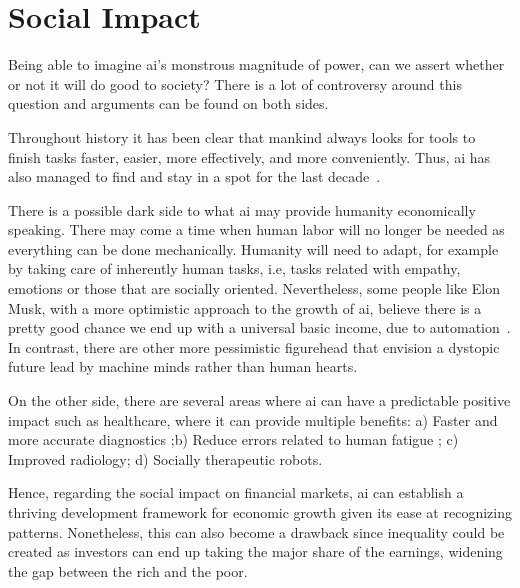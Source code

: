 \chapter{Social Impact}
\label{imp:impacto}

Being able to imagine \gls{ai}'s monstrous magnitude of power, can we assert whether or not it will do good to society? There is a lot of controversy around this question and arguments can be found on both sides.

Throughout history it has been clear that mankind always looks for tools to finish tasks faster, easier, more effectively, and more conveniently. Thus, \gls{ai} has also managed to find and stay in a spot for the last decade~\cite{tai2020impact}.

There is a possible dark side to what \gls{ai} may provide humanity economically speaking. There may come a time when human labor will no longer be needed as everything can be done mechanically. Humanity will need to adapt, for example by taking care of inherently human tasks, i.e, tasks related with empathy, emotions or those that are socially oriented. Nevertheless, some people like Elon Musk, with a more optimistic approach to the growth of \gls{ai}, believe there is a pretty good chance we end up with a universal basic income, due to automation~\cite{elonBasicIncome}. In contrast, there are other more pessimistic figurehead that envision a dystopic future lead by machine minds rather than human hearts.

On the other side, there are several areas where \gls{ai} can have a predictable positive impact such as healthcare, where it can provide multiple benefits: a) Faster and more accurate diagnostics ;b) Reduce errors related to human fatigue ; c) Improved radiology; d) Socially therapeutic robots.

Hence, regarding the social impact on financial markets, \gls{ai} can establish a thriving development framework for economic growth given its ease at recognizing patterns. Nonetheless, this can also become a drawback since inequality could be created as investors can end up taking the major share of the earnings, widening the gap between the rich and the poor.